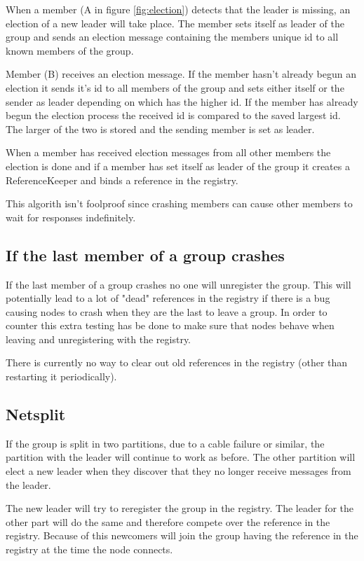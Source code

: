 \documentclass[english]{article}
\begin{document}
When a member (A in figure \ref{fig:election}) detects that the leader is missing, an election of a new leader will take place. The member sets itself as leader of the group and sends an election message containing the members unique id to all known members of the group.

Member (B) receives an election message. If the member hasn't already begun an election it sends it's id to all members of the group and sets either itself or the sender as leader depending on which has the higher id.
If the member has already begun the election process the received id is compared to the saved largest id. The larger of the two is stored and the sending member is set as leader.

When a member has received election messages from all other members the election is done and if a member has set itself as leader of the group it creates a ReferenceKeeper and binds a reference in the registry.

This algorith isn't foolproof since crashing members can cause other members to wait for responses indefinitely.

\subsection{If the last member of a group crashes}
If the last member of a group crashes no one will unregister the group.
This will potentially lead to a lot of "dead" references in the registry if there is a bug causing nodes to crash when they are the last to leave a group. In order to counter this extra testing has be done to make sure that nodes behave when leaving and unregistering with the registry.

There is currently no way to clear out old references in the registry (other than restarting it periodically).

\subsection{Netsplit}
If the group is split in two partitions, due to a cable failure or similar, the partition with the leader will continue to work as before. The other partition will elect a new leader when they discover that they no longer receive messages from the leader.

The new leader will try to reregister the group in the registry. The leader for the other part will do the same and therefore compete over the reference in the registry. Because of this newcomers will join the group having the reference in the registry at the time the node connects.
\end{document}
